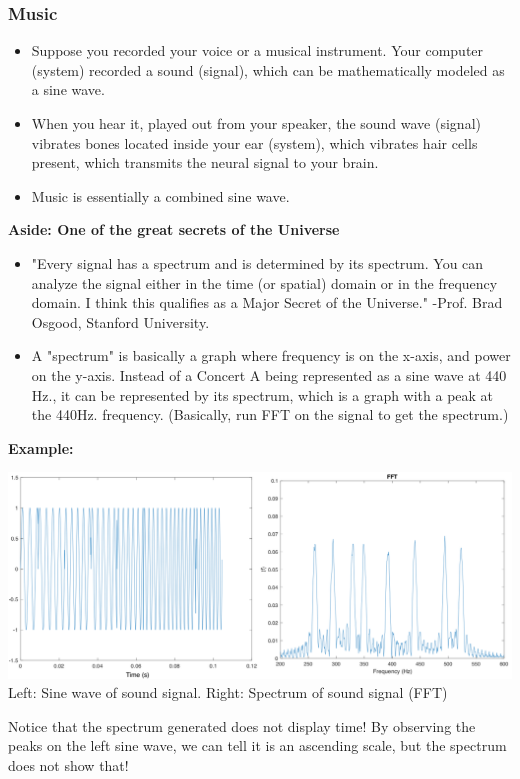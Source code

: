 \documentclass[10pt]{article}
\newcommand{\example}{\textbf{Example: }}
\begin{document}
\subsubsection*{Music}
\begin{itemize}
    \item Suppose you recorded your voice or a musical instrument.  Your computer (system) recorded a sound (signal), which can be mathematically modeled as a sine wave.
    \item When you hear it, played out from your speaker, the sound wave (signal) vibrates bones located inside your ear (system), which vibrates hair cells present, which transmits the neural signal to your brain.
    \item Music is essentially a combined sine wave.
\end{itemize}
\textbf{Aside: One of the great secrets of the Universe}
\begin{itemize}
    \item "Every signal has a spectrum and is determined by its spectrum.  You can analyze the signal either in the time (or spatial) domain or in the frequency domain.  I think this qualifies as a Major Secret of the Universe."  -Prof. Brad Osgood, Stanford University.
    \item A "spectrum" is basically a graph where frequency is on the x-axis, and power on the y-axis.  Instead of a Concert A being represented as a sine wave at 440 Hz., it can be represented by its spectrum, which is a graph with a peak at the 440Hz. frequency.  (Basically, run FFT on the signal to get the spectrum.)
\end{itemize}
\example
\begin{center}
\includegraphics[scale=0.7]{W1_1.png}\\
Left: Sine wave of sound signal.  Right: Spectrum of sound signal (FFT)
\end{center}
Notice that the spectrum generated does not display time!  By observing the peaks on the left sine wave, we can tell it is an ascending scale, but the spectrum does not show that!\\\\
\end{document}
